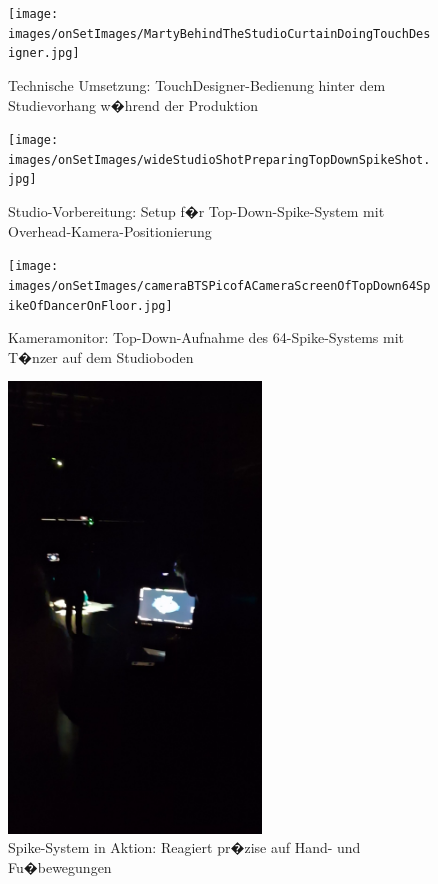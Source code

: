 \begin{figure}[!htbp]
   \centering
   \texttt{[image: images/onSetImages/MartyBehindTheStudioCurtainDoingTouchDesigner.jpg]}
   \caption{Technische Umsetzung: TouchDesigner-Bedienung hinter dem Studievorhang w�hrend der Produktion}
   \label{fig:technical_operation}
\end{figure}

\begin{figure}[!htbp]
   \centering
   \texttt{[image: images/onSetImages/wideStudioShotPreparingTopDownSpikeShot.jpg]}
   \caption{Studio-Vorbereitung: Setup f�r Top-Down-Spike-System mit Overhead-Kamera-Positionierung}
   \label{fig:topdown_setup}
\end{figure}

\begin{figure}[!htbp]
   \centering
   \texttt{[image: images/onSetImages/cameraBTSPicofACameraScreenOfTopDown64SpikeOfDancerOnFloor.jpg]}
   \caption{Kameramonitor: Top-Down-Aufnahme des 64-Spike-Systems mit T�nzer auf dem Studioboden}
   \label{fig:camera_monitor}
\end{figure}

\begin{figure}[!htbp]
   \centering
   \includegraphics[width=0.6\textwidth,height=0.25\textheight,keepaspectratio]{images/BTS_ProducerScreen.png}
   \caption{Spike-System in Aktion: Reagiert pr�zise auf Hand- und Fu�bewegungen}
   \label{fig:spike_action}
\end{figure}

